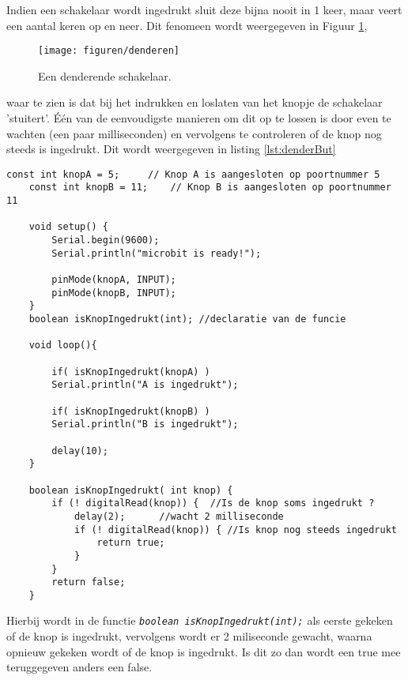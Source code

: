 Indien een schakelaar wordt ingedrukt sluit deze bijna nooit in 1 keer, maar veert een aantal keren op en neer. Dit fenomeen wordt weergegeven in Figuur \ref{fig:swDend}, 
\begin{figure}[h!]
	\captionsetup{justification=centering}
	\texttt{[image: figuren/denderen]}
	\centering
	\caption{Een denderende schakelaar\cite{williams2014make}.}
	\label{fig:swDend}
\end{figure}
waar te zien is dat bij het indrukken en loslaten van het knopje de schakelaar 'stuitert'. 
Één van de eenvoudigste manieren om dit op te lossen is door even te wachten (een paar milliseconden) en vervolgens te controleren of de knop nog steeds is ingedrukt. Dit wordt weergegeven in listing \ref{lst:denderBut}
\newpage
\begin{lstlisting}[caption= Omgaan met een denderende schakelaar.,label={lst:denderBut}]
	const int knopA = 5;     // Knop A is aangesloten op poortnummer 5
	const int knopB = 11;    // Knop B is aangesloten op poortnummer 11
	
	void setup() {  
		Serial.begin(9600);
		Serial.println("microbit is ready!");
		
		pinMode(knopA, INPUT);  
		pinMode(knopB, INPUT);   
	}
	boolean isKnopIngedrukt(int); //declaratie van de funcie
	
	void loop(){
		
		if( isKnopIngedrukt(knopA) )
		Serial.println("A is ingedrukt");
		
		if( isKnopIngedrukt(knopB) )
		Serial.println("B is ingedrukt");       
		
		delay(10);
	}
	
	boolean isKnopIngedrukt( int knop) {
		if (! digitalRead(knop)) {  //Is de knop soms ingedrukt ?
			delay(2);      //wacht 2 milliseconde 
			if (! digitalRead(knop)) { //Is knop nog steeds ingedrukt
				return true;
			}
		}
		return false;
	}
\end{lstlisting}

Hierbij wordt in de functie \texttt{\textit{\textcolor{arduinoBlue}{boolean} isKnopIngedrukt(\textcolor{arduinoBlue}{int});}} als eerste gekeken of de knop is ingedrukt, vervolgens wordt er 2 miliseconde gewacht, waarna opnieuw gekeken wordt of de knop is ingedrukt. Is dit zo dan wordt een \textcolor{arduinoBlue}{true} mee teruggegeven anders een \textcolor{arduinoBlue}{false}.

